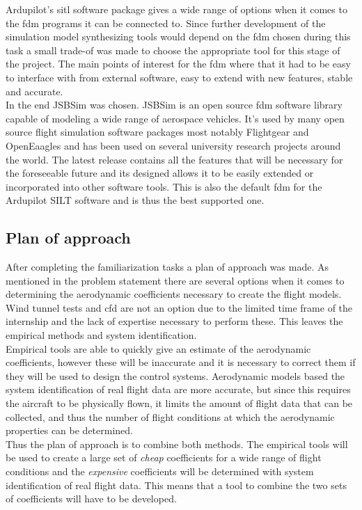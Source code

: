 Ardupilot's \gls{sitl} software package gives a wide range of options when it comes to the \gls{fdm} programs it can be connected to. Since further development of the simulation model synthesizing tools would depend on the \gls{fdm} chosen during this task a small trade-of was made to choose the appropriate tool for this stage of the project. The main points of interest for the \gls{fdm} where that it had to be easy to interface with from external software, easy to extend with new features, stable and accurate. \\

In the end JSBSim was chosen. JSBSim is an open source \gls{fdm} software library capable of modeling a wide range of aerospace vehicles. It's used by many open source flight simulation software packages most notably Flightgear and OpenEaagles and has been used on several university research projects around the world. The latest release contains all the features that will be necessary for the foreseeable future and its designed allows it to be easily extended or incorporated into other software tools. This is also the default \gls{fdm} for the Ardupilot SILT software and is thus the best supported one.

\subsection{Plan of approach}
After completing the familiarization tasks a plan of approach was made. As mentioned in the problem statement there are several options when it comes to determining the aerodynamic coefficients necessary to create the flight models. Wind tunnel tests and \gls{cfd} are not an option due to the limited time frame of the internship and the lack of expertise necessary to perform these. This leaves the empirical methods and system identification. \\

Empirical tools are able to quickly give an estimate of the aerodynamic coefficients, however these will be inaccurate and it is necessary to correct them if they will be used to design the control systems. Aerodynamic models based the system identification of real flight data are more accurate, but since this requires the aircraft to be physically flown, it limits the amount of flight data that can be collected, and thus the number of flight conditions at which the aerodynamic properties can be determined. \\

Thus the plan of approach is to combine both methods. The empirical tools will be used to create a large set of \textit{cheap} coefficients for a wide range of flight conditions and the \textit{expensive} coefficients will be determined with system identification of real flight data. This means that a tool to combine the two sets of coefficients will have to be developed.\\

